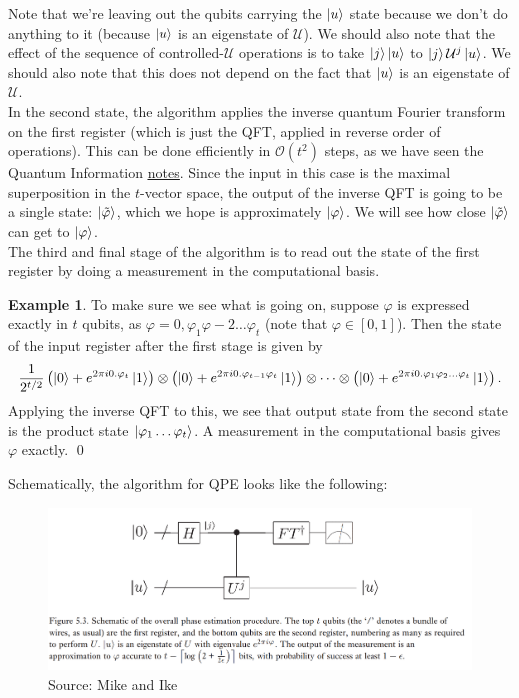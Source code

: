 \documentclass{book}
\theoremstyle{definition}
\newtheorem{exmp}{Example}[section]
\newcommand{\f}[2]{\frac{#1}{#2}}
\newcommand{\lp}{\left(}
\newcommand{\rp}{\right)}
\newcommand{\U}{\mathcal{U}}
\begin{document}
Note that we're leaving out the qubits carrying the  $\ket{u}$ state because we don't do anything to it (because $\ket{u}$ is an eigenstate of $\U$). We should also note that the effect of the sequence of controlled-$\U$ operations is to take $\ket{j}\ket{u}$ to $\ket{j}\U^j \ket{u}$. We should also note that this does not depend on the fact that $\ket{u}$ is an eigenstate of $\U$. \\


In the second state, the algorithm applies the inverse quantum Fourier transform on the first register (which is just the QFT, applied in reverse order of operations). This can be done efficiently in $\mathcal{O}(t^2)$ steps, as we have seen the Quantum Information \href{https://huanqbui.com/LaTeX 20projects/HuanBui_QI/HuanBui_QI.pdf}{\underline{notes}}. Since the input in this case is the maximal superposition in the $t$-vector space, the output of the inverse QFT is going to be a single state: $\ket{\tilde{\varphi}}$, which we hope is approximately $\ket{\varphi}$. We will see how close $\ket{\tilde\varphi}$ can get to $\ket{\varphi}$.\\

The third and final stage of the algorithm is to read out the state of the first register by doing a measurement in the computational basis. \\


\begin{exmp}
	To make sure we see what is going on, suppose $\varphi$ is expressed exactly in $t$ qubits, as $\varphi = 0,\varphi_1\varphi-2\dots\varphi_t$ (note that $\varphi \in [0,1]$). Then the state of the input register after the first stage is given by
	\begin{align}
	\f{1}{2^{t/2}}\lp \ket{0} + e^{2\pi i 0.\varphi_t} \ket{1} \rp \otimes \lp \ket{0} + e^{2\pi i 0.\varphi_{t-1}\varphi_t}\ket{1} \rp \otimes \dots  \otimes \lp \ket{0} + e^{2\pi i 0.\varphi_1\varphi_2\dots\varphi_t}\ket{1} \rp.
	\end{align}
	Applying the inverse QFT to this, we see that output state from the second state is the product state $\ket{\varphi_1\dots \varphi_t}$. A measurement in the computational basis gives $\varphi$ exactly. \qed
\end{exmp}

Schematically, the algorithm for QPE looks like the following:
\begin{figure}[!htb]
	\centering
	\includegraphics[scale=0.25]{qpe2}
	\caption{Source: Mike and Ike}
\end{figure}
\end{document}
